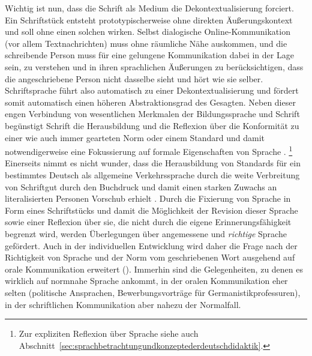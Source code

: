 Wichtig ist nun, dass die Schrift als Medium die Dekontextualisierung forciert.
Ein Schriftstück entsteht prototypischerweise ohne direkten Äußerungskontext und soll ohne einen solchen wirken.
Selbst dialogische Online-Kommunikation (vor allem Textnachrichten) muss ohne räumliche Nähe auskommen, und die schreibende Person muss für eine gelungene Kommunikation dabei in der Lage sein, zu verstehen und in ihren sprachlichen Äußerungen zu berücksichtigen, dass die angeschriebene Person nicht dasselbe sieht und hört wie sie selber.
Schriftsprache führt also automatisch zu einer Dekontextualisierung und fördert somit automatisch einen höheren Abstraktionsgrad des Gesagten.
Neben dieser engen Verbindung von wesentlichen Merkmalen der Bildungssprache und Schrift begünstigt Schrift die Herausbildung und die Reflexion über die Konformität zu einer wie auch immer gearteten Norm oder einem Standard und damit notwendigerweise eine Fokussierung auf formale Eigenschaften von Sprache \citep[41]{Bredel2013}.%
\footnote{Zur expliziten Reflexion über Sprache siehe auch Abschnitt~\ref{sec:sprachbetrachtungundkonzeptederdeutschdidaktik}.}
Einerseits nimmt es nicht wunder, dass die Herausbildung von Standards für ein bestimmtes Deutsch als allgemeine Verkehrssprache durch die weite Verbreitung von Schriftgut durch den Buchdruck und damit einen starken Zuwachs an literalisierten Personen Vorschub erhielt \citep[301--352]{Nerius2007}. 
Durch die Fixierung von Sprache in Form eines Schriftstücks und damit die Möglichkeit der Revision dieser Sprache sowie einer Reflexion über sie, die nicht durch die eigene Erinnerungsfähigkeit begrenzt wird, werden Überlegungen über angemessene und \textit{richtige} Sprache gefördert.
Auch in der individuellen Entwicklung wird daher die Frage nach der Richtigkeit von Sprache und der Norm vom geschriebenen Wort ausgehend auf orale Kommunikation erweitert (\zB \citealt[72]{Portmanntselikas2011}).
Immerhin sind die Gelegenheiten, zu denen es wirklich auf normnahe Sprache ankommt, in der oralen Kommunikation eher selten (\zB politische Ansprachen, Bewerbungsvorträge für Germanistikprofessuren), in der schriftlichen Kommunikation aber nahezu der Normalfall.

